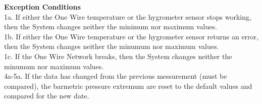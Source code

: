 \documentclass[letterpaper]{article}
\begin{document}
\textbf{Exception Conditions}\\
1a.  If either the One Wire temperature or the hygrometer sensor
stops working, then the System changes neither the minimum nor
maximum values.\\
1b.  If either the One Wire temperature  or the hygrometer sensor
returns an error, then the System changes neither the minumum nor
maximum values.\\
1c.  If the One Wire Network breaks, then the System changes neither
the minumum nor maximum values.\\
4a-5a.  If the data has changed from the previous messurement (must be
compared), the barmetric pressure extremum are reset to the default
values and compared for the new date.
\end{document}
